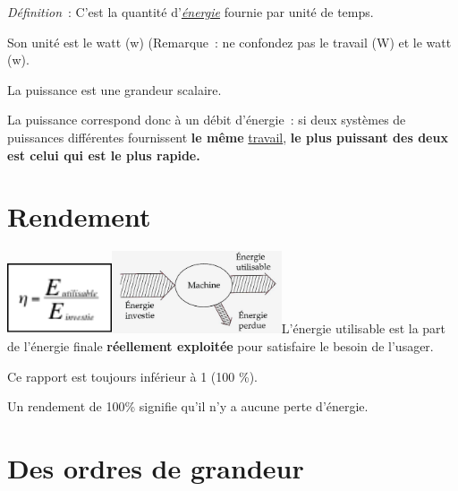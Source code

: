 \begin{multicols}{2}
\emph{Définition}~: C'est la quantité
d'\href{https://fr.wikipedia.org/wiki/\%C3\%89nergie_(physique)}{\emph{\emph{énergie}}}
fournie par unité de temps.

Son unité est le watt (w) (Remarque~: ne confondez pas le travail (W) et
le watt (w).

La puissance est une grandeur scalaire.

La puissance correspond donc à un débit d'énergie~: si deux systèmes de
puissances différentes fournissent \textbf{le même
}\href{https://fr.wikipedia.org/wiki/Travail_d\%27une_force}{travail},
\textbf{le plus puissant des deux est celui qui est le plus rapide.}




\section{Rendement }

\includegraphics[width=3.108cm,height=2.073cm]{Pictures/10000001000000500000003510F712318EAE4AA8.png}\includegraphics[width=5.011cm,height=2.441cm]{Pictures/100000010000046C00000226E09CB53258956B76.png}L'énergie
utilisable est la part de l'énergie finale \textbf{réellement exploitée}
pour satisfaire le besoin de l'usager.

Ce rapport est toujours inférieur à 1 (100 \%).

Un rendement de 100\% signifie qu'il n'y a aucune perte d'énergie.

\section{Des ordres de grandeur }


\end{multicols}
